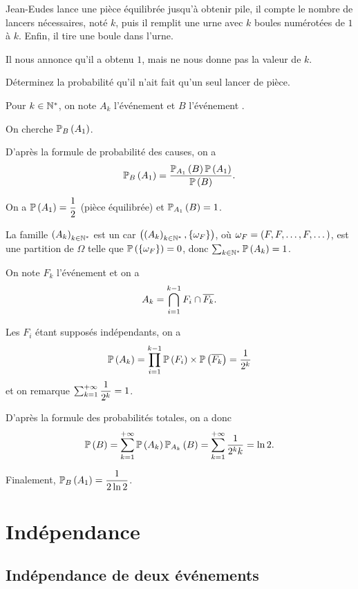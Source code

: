 \begin{exo}
Jean-Eudes lance une pièce équilibrée jusqu'à obtenir pile, il compte le nombre de lancers nécessaires, noté \(k\), puis il remplit une urne avec \(k\) boules numérotées de \(1\) à \(k\). Enfin, il tire une boule dans l'urne.

Il nous annonce qu'il a obtenu \(1\), mais ne nous donne pas la valeur de \(k\).

Déterminez la probabilité qu'il n'ait fait qu'un seul lancer de pièce.
\end{exo}

\begin{corr}
Pour \(k\in\Ns\), on note \(A_k\) l'événement  et \(B\) l'événement .

On cherche \(\probacond{A_1}{B}\).

D'après la formule de probabilité des causes, on a \[\probacond{A_1}{B}=\dfrac{\probacond{B}{A_1}\proba{A_1}}{\proba{B}}.\]

On a \(\proba{A_1}=\dfrac{1}{2}\) (pièce équilibrée) et \(\probacond{B}{A_1}=1\).

La famille \(\paren{A_k}_{k\in\Ns}\) est un \sqce car \(\paren{\paren{A_k}_{k\in\Ns},\accol{\omega_F}}\), où \(\omega_F=\paren{F,F,\dots,F,\dots}\), est une partition de \(\Omega\) telle que \(\proba{\accol{\omega_F}}=0\), donc \(\sum_{k\in\Ns}\proba{A_k}=1\).

On note \(F_k\) l'événement  et on a \[A_k=\biginter_{i=1}^{k-1}F_i\inter\conj{F_k}.\]

Les \(F_i\) étant supposés indépendants, on a \[\proba{A_k}=\prod_{i=1}^{k-1}\proba{F_i}\times\proba{\conj{F_k}}=\dfrac{1}{2^k}\] et on remarque \(\sum_{k=1}^{\pinf}\dfrac{1}{2^k}=1\).

D'après la formule des probabilités totales, on a donc \[\proba{B}=\sum_{k=1}^{\pinf}\proba{A_k}\probacond{B}{A_k}=\sum_{k=1}^{\pinf}\dfrac{1}{2^kk}=\ln2.\]

Finalement, \(\probacond{A_1}{B}=\dfrac{1}{2\ln2}\).
\end{corr}

\section{Indépendance}

\subsection{Indépendance de deux événements}

